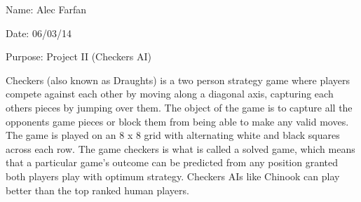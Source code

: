 Name\-: Alec Farfan \par
 Date\-: 06/03/14 \par
 Purpose\-: Project I\-I (Checkers A\-I) \par
 \par
 Checkers (also known as Draughts) is a two person strategy game where players compete against each other by moving along a diagonal axis, capturing each others pieces by jumping over them. The object of the game is to capture all the opponents game pieces or block them from being able to make any valid moves. The game is played on an 8 x 8 grid with alternating white and black squares across each row. The game checkers is what is called a solved game, which means that a particular game's outcome can be predicted from any position granted both players play with optimum strategy. Checkers A\-Is like Chinook can play better than the top ranked human players. 